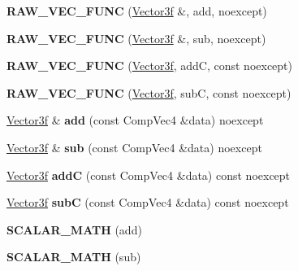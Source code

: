 \begin{DoxyCompactItemize}
{\bfseries R\+A\+W\+\_\+\+V\+E\+C\+\_\+\+F\+U\+NC} (\mbox{\hyperlink{class_vector3f}{Vector3f}} \&, add, noexcept)
\item 
\mbox{\label{class_vector3f_a0ed84add7cd4af54e1e60d4fa18e38a6}} 
{\bfseries R\+A\+W\+\_\+\+V\+E\+C\+\_\+\+F\+U\+NC} (\mbox{\hyperlink{class_vector3f}{Vector3f}} \&, sub, noexcept)
\item 
\mbox{\label{class_vector3f_adb73681adf2f1dafdfe38952520426a8}} 
{\bfseries R\+A\+W\+\_\+\+V\+E\+C\+\_\+\+F\+U\+NC} (\mbox{\hyperlink{class_vector3f}{Vector3f}}, addC, const noexcept)
\item 
\mbox{\label{class_vector3f_ad4b799dada66a42da73fcc69ac80dbae}} 
{\bfseries R\+A\+W\+\_\+\+V\+E\+C\+\_\+\+F\+U\+NC} (\mbox{\hyperlink{class_vector3f}{Vector3f}}, subC, const noexcept)
\item 
\mbox{\label{class_vector3f_adbb945616bc1fe866c7a91f5b959a6b7}} 
\mbox{\hyperlink{class_vector3f}{Vector3f}} \& {\bfseries add} (const Comp\+Vec4 \&data) noexcept
\item 
\mbox{\label{class_vector3f_ac46dbd570369dc7b92f058745797bb7e}} 
\mbox{\hyperlink{class_vector3f}{Vector3f}} \& {\bfseries sub} (const Comp\+Vec4 \&data) noexcept
\item 
\mbox{\label{class_vector3f_af0e7dc08eab2ec9a2302d4121102defb}} 
\mbox{\hyperlink{class_vector3f}{Vector3f}} {\bfseries addC} (const Comp\+Vec4 \&data) const noexcept
\item 
\mbox{\label{class_vector3f_a53cca8b48539285982e87e0f9d6901b5}} 
\mbox{\hyperlink{class_vector3f}{Vector3f}} {\bfseries subC} (const Comp\+Vec4 \&data) const noexcept
\item 
\mbox{\label{class_vector3f_a48c64756150fc5e4219be4c2d9d3fec0}} 
{\bfseries S\+C\+A\+L\+A\+R\+\_\+\+M\+A\+TH} (add)
\item 
\mbox{\label{class_vector3f_ad28edcbe986adb1f0b2762451cbeed88}} 
{\bfseries S\+C\+A\+L\+A\+R\+\_\+\+M\+A\+TH} (sub)
\item 
\mbox{\label{class_vector3f_a511bb22386ab52853b2946765829db30}} 

\end{DoxyCompactItemize}
